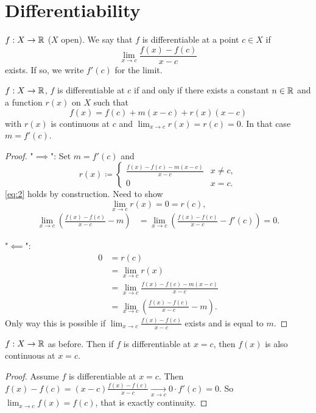 \chapter{Differentiability}\label{cha:differentiability}

\begin{definition}\label{def:differentiable}
    $f : X \to \mathbb{R}$
    ($X$ open).
    We say that $f$ is differentiable at a point $c \in X$ if
    \[
    \lim_{x \to c}\frac{f(x) - f(c)}{x - c}
    \]
    exists.
    If so,
    we write $f'(c)$ for the limit.
\end{definition}

\begin{lemma}\label{lem:firstordertaylor}
    $f : X \to \mathbb{R}$,
    $f$ is differentiable at $c$ if and only if there exists a constant $n \in \mathbb{R}$ and a function $r(x)$ on $X$ such that
    \begin{equation}\label{eq:2}
        f(x) = f(c) + m(x - c) + r(x)(x - c)
    \end{equation}
    with $r(x)$ is continuous at $c$ and $\lim_{x \to c} r(x) = r(c) = 0$.
    In that case $m = f'(c)$.
\end{lemma}
\begin{proof}
    "$\implies$":
    Set $m = f'(c)$ and
    \[
    r(x) \coloneqq \begin{cases}
        \frac{f(x) - f(c) - m(x - c)}{x - c} & x \neq c, \\
        0 & x = c.
    \end{cases}
    \]
    \eqref{eq:2} holds by construction.
    Need to show
    \[
    \lim_{x \to c}r(x) = 0 = r(c),
    \]
    \begin{align*}
        \lim_{x \to c}\left(\frac{f(x) - f(c)}{x - c} - m\right) &= \lim_{x \to c}\left(\frac{f(x) - f(c)}{x - c} - f'(c)\right) = 0.
    \end{align*}

    "$\impliedby$":
    \begin{align*}
        0 &= r(c) \\
        &= \lim_{x \to c}r(x) \\
        &= \lim_{x \to c}\frac{f(x) - f(c) - m(x - c)}{x - c} \\
        &= \lim_{x \to c}\left(\frac{f(x) - f(c)}{x - c} - m\right).
    \end{align*}
    Only way this is possible if $\lim_{x \to c}\frac{f(x) - f(c)}{x - c}$ exists and is equal to $m$.
\end{proof}

\begin{proposition}\label{prop:diffcont}
    $f : X \to \mathbb{R}$ as before.
    Then if $f$ is differentiable at $x = c$,
    then $f(x)$ is also continuous at $x = c$.
\end{proposition}
\begin{proof}
    Assume $f$ is differentiable at $x = c$.
    Then $f(x) - f(c) = (x - c) \frac{f(x) - f(c)}{x - c} \xrightarrow[x \to c]{} 0 \cdot f'(c) = 0$.
    So $\lim_{x \to c}f(x) = f(c)$,
    that is exactly continuity.
\end{proof}